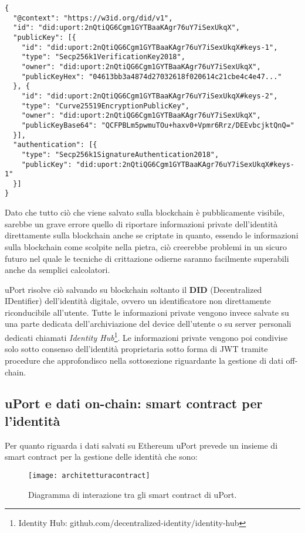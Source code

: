 \begin{lstlisting}[numbers=none]
{
  "@context": "https://w3id.org/did/v1",
  "id": "did:uport:2nQtiQG6Cgm1GYTBaaKAgr76uY7iSexUkqX",
  "publicKey": [{
    "id": "did:uport:2nQtiQG6Cgm1GYTBaaKAgr76uY7iSexUkqX#keys-1",
    "type": "Secp256k1VerificationKey2018",
    "owner": "did:uport:2nQtiQG6Cgm1GYTBaaKAgr76uY7iSexUkqX",
    "publicKeyHex": "04613bb3a4874d27032618f020614c21cbe4c4e47..."
  }, {
    "id": "did:uport:2nQtiQG6Cgm1GYTBaaKAgr76uY7iSexUkqX#keys-2",
    "type": "Curve25519EncryptionPublicKey",
    "owner": "did:uport:2nQtiQG6Cgm1GYTBaaKAgr76uY7iSexUkqX",
    "publicKeyBase64": "QCFPBLm5pwmuTOu+haxv0+Vpmr6Rrz/DEEvbcjktQnQ="
  }],
  "authentication": [{
    "type": "Secp256k1SignatureAuthentication2018",
    "publicKey": "did:uport:2nQtiQG6Cgm1GYTBaaKAgr76uY7iSexUkqX#keys-1"
  }]
}
\end{lstlisting}

Dato che tutto ciò che viene salvato sulla blockchain è pubblicamente visibile, sarebbe un grave errore quello
di riportare informazioni private dell'identità direttamente sulla blockchain anche se criptate
in quanto, essendo le informazioni sulla blockchain come scolpite nella pietra, ciò creerebbe
problemi in un sicuro futuro nel quale le tecniche di crittazione odierne saranno facilmente superabili anche da semplici calcolatori.

uPort risolve ciò salvando su blockchain soltanto il \textbf{DID} (Decentralized IDentifier) dell'identità digitale,
ovvero un identificatore non direttamente riconducibile all'utente.
Tutte le informazioni private vengono invece salvate su una parte dedicata dell'archiviazione del device dell'utente o su 
server personali dedicati chiamati \emph{Identity Hub}\footnote{Identity Hub: github.com/decentralized-identity/identity-hub}.
Le informazioni private vengono poi condivise solo sotto consenso dell'identità proprietaria sotto forma di JWT tramite
procedure che approfondisco nella sottosezione riguardante la gestione di dati off-chain. \cite{WEBSITE:2}


\subsection{uPort e dati on-chain: smart contract per l'identità}

Per quanto riguarda i dati salvati su Ethereum uPort 
prevede un insieme di smart contract
per la gestione delle identità che sono:

\begin{figure}[!ht]
    \texttt{[image: architetturacontract]}
    \caption{Diagramma di interazione tra gli smart contract di uPort.}
    \label{fig:architetturacontract}
\end{figure}

